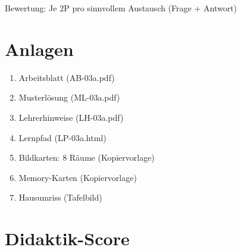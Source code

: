 \documentclass[11pt,a4paper]{article}
\begin{document}
Bewertung: Je 2P pro sinnvollem Austausch (Frage + Antwort)

\section{Anlagen}

\begin{enumerate}
    \item Arbeitsblatt (AB-03a.pdf)
    \item Musterlösung (ML-03a.pdf)
    \item Lehrerhinweise (LH-03a.pdf)
    \item Lernpfad (LP-03a.html)
    \item Bildkarten: 8 Räume (Kopiervorlage)
    \item Memory-Karten (Kopiervorlage)
    \item Hausumriss (Tafelbild)
\end{enumerate}

\newpage
\section{Didaktik-Score}
\end{document}
